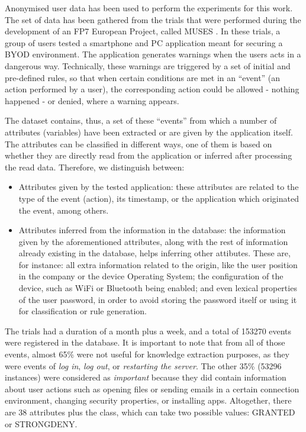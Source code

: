 \documentclass[a4paper,10pt,twocolumn,preprint,3p]{elsarticle}
\begin{document}
Anonymised user data has been used to perform the experiments for this work. The set of data has been gathered from the trials that were performed during the development of an FP7 European Project, called MUSES \cite{DBLP:conf/sac/MoraCGZJEBAH14}. In these trials, a group of users tested a smartphone and PC application meant for securing a BYOD environment. The application generates warnings when the users acts in a dangerous way. Technically, these warnings are triggered by a set of initial and pre-defined rules, so that when certain conditions are met in an ``event'' (an action performed by a user), the corresponding action could be allowed - nothing happened - or denied, where a warning appears.

The dataset contains, thus, a set of these ``events'' from which a number of attributes (variables) have been extracted or are given by the application itself. The attributes can be classified in different ways, one of them is based on whether they are directly read from the application or inferred after processing the read data. Therefore, we distinguish between:
\begin{itemize}
  \item Attributes given by the tested application: these attributes are related to the type of the event (action), its timestamp, or the application which originated the event, among others.
  \item Attributes inferred from the information in the database: the information given by the aforementioned attributes, along with the rest of information already existing in the database, helps inferring other attibutes.
       These are, for instance: all extra information related to the origin, like the user position in the company or the device Operating System; the configuration of the device, such as WiFi or Bluetooth being enabled; and even lexical properties of the user password, in order to avoid storing the password itself or using it for classification or rule generation.
\end{itemize}

The trials had a duration of a month plus a week, and a total of 153270 events were registered in the database. It is important to note that from all of those events, almost 65\% were not useful for knowledge extraction purposes, as they were events of \textit{log in}, \textit{log out}, or \textit{restarting the server}. The other 35\% (53296 instances) were considered as \textit{important} because they did contain information about user actions such as opening files or sending emails in a certain connection environment, changing security properties, or installing apps. Altogether, there are 38 attributes plus the class, which can take two possible values: GRANTED or STRONGDENY.
\end{document}
